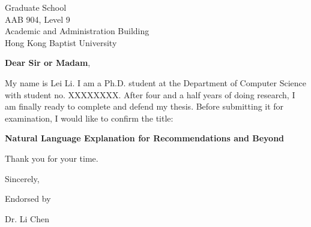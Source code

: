 \documentclass[10pt]{letter} %
\begin{document}

\begin{letter}{Graduate School \\ AAB 904, Level 9 \\ Academic and Administration Building \\ Hong Kong Baptist University} %


\opening{\textbf{Dear Sir or Madam},}

My name is Lei Li.
I am a Ph.D. student at the Department of Computer Science with student no. XXXXXXXX.
After four and a half years of doing research, I am finally ready to complete and defend my thesis.
Before submitting it for examination, I would like to confirm the title:

\begin{center}
\textbf{Natural Language Explanation for Recommendations and Beyond}
\end{center}

Thank you for your time.

\vspace{2\parskip} %
\closing{Sincerely,}
\vspace{2\parskip} %

Endorsed by

\vspace{2\parskip} %
\vspace{2\parskip} %

Dr. Li Chen




\end{letter}
 
\end{document}

